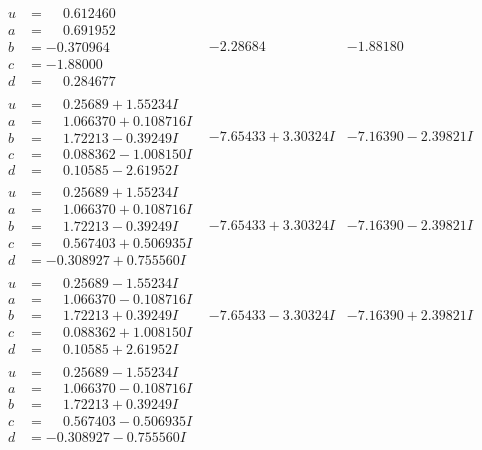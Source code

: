 \documentclass[1p]{elsarticle_modified}
\theoremstyle{definition}
\begin{document}
$$\begin{array}{c|c|c}
\begin{aligned}
u &= \phantom{-}0.612460\phantom{ +0.000000I} \\
a &= \phantom{-}0.691952\phantom{ +0.000000I} \\
b &= -0.370964\phantom{ +0.000000I} \\
c &= -1.88000\phantom{ +0.000000I} \\
d &= \phantom{-}0.284677\phantom{ +0.000000I}\end{aligned}
 & -2.28684\phantom{ +0.000000I} & -1.88180\phantom{ +0.000000I} \\ \hline\begin{aligned}
u &= \phantom{-}0.25689 + 1.55234 I \\
a &= \phantom{-}1.066370 + 0.108716 I \\
b &= \phantom{-}1.72213 - 0.39249 I \\
c &= \phantom{-}0.088362 - 1.008150 I \\
d &= \phantom{-}0.10585 - 2.61952 I\end{aligned}
 & -7.65433 + 3.30324 I & -7.16390 - 2.39821 I \\ \hline\begin{aligned}
u &= \phantom{-}0.25689 + 1.55234 I \\
a &= \phantom{-}1.066370 + 0.108716 I \\
b &= \phantom{-}1.72213 - 0.39249 I \\
c &= \phantom{-}0.567403 + 0.506935 I \\
d &= -0.308927 + 0.755560 I\end{aligned}
 & -7.65433 + 3.30324 I & -7.16390 - 2.39821 I \\ \hline\begin{aligned}
u &= \phantom{-}0.25689 - 1.55234 I \\
a &= \phantom{-}1.066370 - 0.108716 I \\
b &= \phantom{-}1.72213 + 0.39249 I \\
c &= \phantom{-}0.088362 + 1.008150 I \\
d &= \phantom{-}0.10585 + 2.61952 I\end{aligned}
 & -7.65433 - 3.30324 I & -7.16390 + 2.39821 I \\ \hline\begin{aligned}
u &= \phantom{-}0.25689 - 1.55234 I \\
a &= \phantom{-}1.066370 - 0.108716 I \\
b &= \phantom{-}1.72213 + 0.39249 I \\
c &= \phantom{-}0.567403 - 0.506935 I \\
d &= -0.308927 - 0.755560 I\end{aligned}

\end{array}$$
\end{document}

